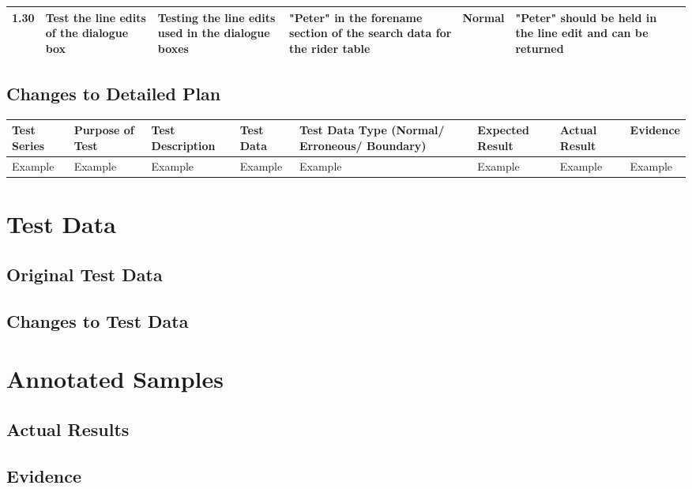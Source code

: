 \begin{landscape}
\begin{center}
\begin{longtable}{|p{1.5cm}|p{2.5cm}|p{2.5cm}|p{2cm}|p{2cm}|p{2cm}|p{2cm}|p{2cm}|}
        1.30 & Test the line edits of the dialogue box & Testing the line edits used in the dialogue boxes & "Peter" in the forename section of the search data for the rider table & Normal & "Peter" should be held in the line edit and can be returned & & \\ \hline 
    \end{longtable}
\end{center}



\subsection{Changes to Detailed Plan}

\begin{center}
    \begin{longtable}{|p{1.5cm}|p{2.5cm}|p{2.5cm}|p{2cm}|p{2cm}|p{2cm}|p{2cm}|p{2cm}|}
        \hline
        \textbf{Test Series} & \textbf{Purpose of Test} & \textbf{Test Description} & \textbf{Test Data} & \textbf{Test Data Type (Normal/ Erroneous/ Boundary)} & \textbf{Expected Result} & \textbf{Actual Result} & \textbf{Evidence}\\ \hline
        Example & Example & Example & Example & Example & Example & Example & Example \\ \hline
    \end{longtable}
\end{center}

\section{Test Data}

\subsection{Original Test Data}

\subsection{Changes to Test Data}

\section{Annotated Samples}

\subsection{Actual Results}

\subsection{Evidence}

\end{landscape}

